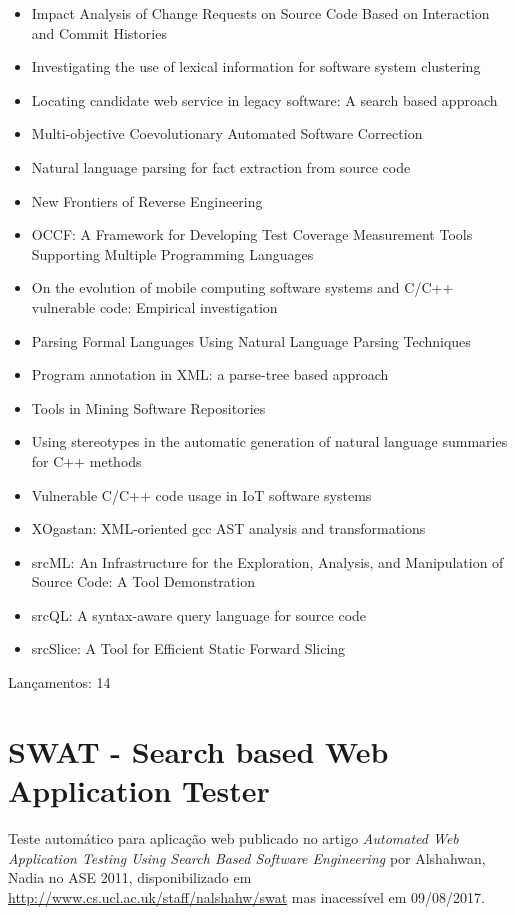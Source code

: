 \begin{itemize}
\item Impact Analysis of Change Requests on Source Code Based on Interaction and Commit Histories
\item Investigating the use of lexical information for software system clustering
\item Locating candidate web service in legacy software: A search based approach
\item Multi-objective Coevolutionary Automated Software Correction
\item Natural language parsing for fact extraction from source code
\item New Frontiers of Reverse Engineering
\item OCCF: A Framework for Developing Test Coverage Measurement Tools Supporting Multiple Programming Languages
\item On the evolution of mobile computing software systems and C/C++ vulnerable code: Empirical investigation
\item Parsing Formal Languages Using Natural Language Parsing Techniques
\item Program annotation in XML: a parse-tree based approach
\item Tools in Mining Software Repositories
\item Using stereotypes in the automatic generation of natural language summaries for C++ methods
\item Vulnerable C/C++ code usage in IoT software systems
\item XOgastan: XML-oriented gcc AST analysis and transformations
\item srcML: An Infrastructure for the Exploration, Analysis, and Manipulation of Source Code: A Tool Demonstration
\item srcQL: A syntax-aware query language for source code
\item srcSlice: A Tool for Efficient Static Forward Slicing
\end{itemize}

Lançamentos: 14

\section{SWAT - Search based Web Application Tester}

Teste automático para aplicação web
publicado no artigo {\it Automated Web Application Testing Using Search Based Software Engineering}
por Alshahwan, Nadia
no ASE 2011,
disponibilizado em \url{http://www.cs.ucl.ac.uk/staff/nalshahw/swat}
mas inacessível em 09/08/2017.

